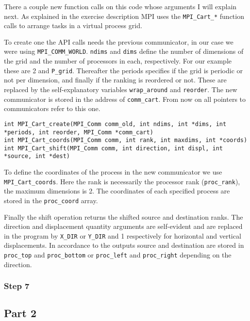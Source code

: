 There a couple new function calls on this code whose arguments I will explain next.
As explained in the exercise description MPI uses the \texttt{MPI\_Cart\_*} function calls to arrange tasks in a virtual process grid.

To create one the API calls needs the previous communicator, in our case we were using \texttt{MPI\_COMM\_WORLD}. \texttt{ndims} and \texttt{dims} define the number of dimensions of the grid and the number of processors in each, respectively. For our example these are 2 and \texttt{P\_grid}. Thereafter the periods specifies if the grid is periodic or not per dimension, and finally if the ranking is reordered or not. These are replaced by the self-explanatory variables \texttt{wrap\_around} and \texttt{reorder}. The new communicator is stored in the address of \texttt{comm\_cart}. From now on all pointers to communicators refer to this one.

\begin{lstlisting}
int MPI_Cart_create(MPI_Comm comm_old, int ndims, int *dims, int *periods, int reorder, MPI_Comm *comm_cart)
int MPI_Cart_coords(MPI_Comm comm, int rank, int maxdims, int *coords)
int MPI_Cart_shift(MPI_Comm comm, int direction, int displ, int *source, int *dest)
\end{lstlisting}

To define the coordinates of the process in the new communicator we use \texttt{MPI\_Cart\_coords}. Here the rank is necessarily the processor rank (\texttt{proc\_rank}), the maximum dimensions is 2. The coordinates of each specified process are stored in the \texttt{proc\_coord} array.

Finally the shift operation returns the shifted source and destination ranks. The direction and displacement quantity arguments are self-evident and are replaced in the program by \texttt{X\_DIR} or \texttt{Y\_DIR} and 1 respectively for horizontal and vertical displacements. In accordance to the outputs source and destination are stored in \texttt{proc\_top} and \texttt{proc\_bottom} or \texttt{proc\_left} and \texttt{proc\_right} depending on the direction. 

\subsubsection{Step 7}


\subsection{Part 2}